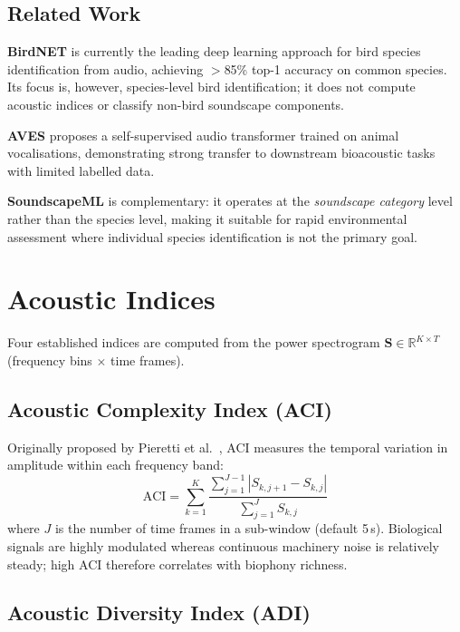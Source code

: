 \documentclass[10pt,twocolumn]{article}
\begin{document}
\subsection{Related Work}

\textbf{BirdNET} \cite{kahl2021} is currently the leading deep learning
approach for bird species identification from audio, achieving $>$85\%
top-1 accuracy on common species.  Its focus is, however, species-level
bird identification; it does not compute acoustic indices or classify
non-bird soundscape components.

\textbf{AVES} \cite{hagiwara2022} proposes a self-supervised audio
transformer trained on animal vocalisations, demonstrating strong transfer
to downstream bioacoustic tasks with limited labelled data.

\textbf{SoundscapeML} is complementary: it operates at the
\emph{soundscape category} level rather than the species level, making it
suitable for rapid environmental assessment where individual species
identification is not the primary goal.

\section{Acoustic Indices}
\label{sec:indices}

Four established indices are computed from the power spectrogram
$\mathbf{S} \in \mathbb{R}^{K \times T}$ (frequency bins $\times$ time frames).

\subsection{Acoustic Complexity Index (ACI)}

Originally proposed by Pieretti et al.\ \cite{pieretti2011}, ACI measures the
temporal variation in amplitude within each frequency band:
\begin{equation}
  \mathrm{ACI} = \sum_{k=1}^{K}
    \frac{\sum_{j=1}^{J-1} |S_{k,j+1} - S_{k,j}|}
         {\sum_{j=1}^{J} S_{k,j}}
  \label{eq:aci}
\end{equation}
where $J$ is the number of time frames in a sub-window (default 5\,s).
Biological signals are highly modulated whereas continuous machinery noise is
relatively steady; high ACI therefore correlates with biophony richness.

\subsection{Acoustic Diversity Index (ADI)}
\end{document}
